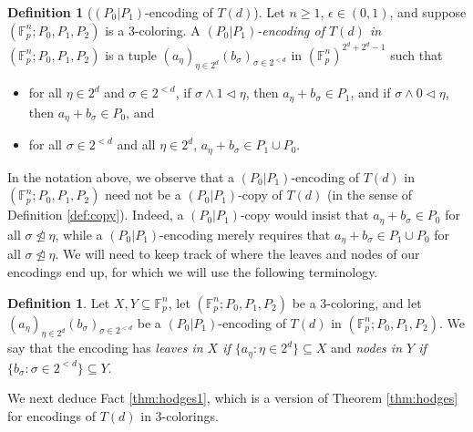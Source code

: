 \documentclass[12pt,oneside,british,a4wide]{amsart}
\numberwithin{equation}{section}
\theoremstyle{definition}
\newtheorem{definition}[theorem]{Definition}
\def\F{\mathbb{F}}
\def\e{\epsilon}
\begin{document}
\begin{definition}[$(P_0|P_1)$-encoding of $T(d)$]\label{def:goodenc}
Let $n\geq 1$, $\e\in (0,1)$, and suppose $(\F_p^n; P_0,P_1,P_2)$ is a $3$-coloring.  A \emph{$(P_0|P_1)$-encoding of $T(d)$ in $(\F_p^n; P_0,P_1,P_2)$} is a tuple $(a_{\eta})_{\eta\in 2^d}(b_{\sigma})_{\sigma\in 2^{<d}}$ in $(\F_p^n)^{2^d+2^d-1}$ such that 
\begin{itemize}
\item for all $\eta\in 2^d$ and $\sigma\in 2^{<d}$, if $\sigma\wedge 1\triangleleft \eta$, then $a_{\eta}+b_{\sigma}\in P_1$, and if $\sigma\wedge 0\triangleleft \eta$, then $a_{\eta}+b_{\sigma}\in P_0$, and
\item for all $\sigma\in 2^{<d}$ and all $\eta\in 2^d$, $a_{\eta}+b_{\sigma}\in P_1\cup P_0$.
\end{itemize}
\end{definition}


In the notation above, we observe that a $(P_0|P_1)$-encoding of $T(d)$ in $(\F_p^n; P_0,P_1,P_2)$ need not be a $(P_0|P_1)$-copy of $T(d)$ (in the sense of Definition \ref{def:copy}).  Indeed, a $(P_0|P_1)$-copy would insist that $a_{\eta}+b_{\sigma}\in  P_0$ for all $\sigma\ntrianglelefteq \eta$, while a $(P_0|P_1)$-encoding merely requires that $a_{\eta}+b_{\sigma}\in  P_1\cup P_0$ for all $\sigma\ntrianglelefteq \eta$.  We will need to keep track of where the leaves and nodes of our encodings end up, for which we will use the following terminology.

\begin{definition}\label{def:nodesleaves}
Let $X,Y\subseteq \F_p^n$, let $(\F_p^n; P_0,P_1,P_2)$ be a $3$-coloring, and let $(a_{\eta})_{\eta\in 2^d}(b_{\sigma})_{\sigma\in 2^{<d}}$ be a $(P_0|P_1)$-encoding of $T(d)$ in $(\F_p^n; P_0,P_1,P_2)$.  We say that the encoding has \emph{leaves in $X$ if $\{a_\eta: \eta\in 2^d\}\subseteq X$} and \emph{nodes in $Y$ if $\{b_{\sigma}:\sigma\in 2^{<d}\}\subseteq Y$}.
\end{definition}



We next deduce Fact \ref{thm:hodges1}, which is a version of Theorem \ref{thm:hodges} for encodings of $T(d)$ in $3$-colorings.  
\end{document}
